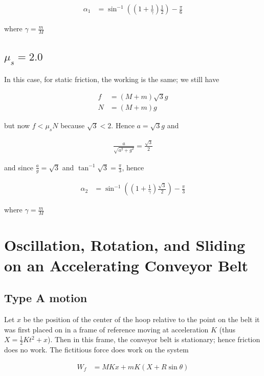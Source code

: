 \documentclass{article}
\newcommand{\half}{\frac{1}{2}}
\begin{document}
\begin{align*}
\alpha_1 &= \sin^{-1}((1 + \frac{1}{\gamma}) \half) - \frac{\pi}{6}
\end{align*}

where $\gamma = \frac{m}{M}$

\subsection{$\mu_s = 2.0$}

In this case, for static friction, the working is the same; we still have

\begin{align*}
f &= (M+m)\sqrt{3}g \\
N &= (M+m)g
\end{align*}

but now $f < \mu_s N$ because $\sqrt 3 < 2$. Hence $a = \sqrt{3}g$ and

\begin{align*}
\frac{a}{\sqrt{a^2 + g^2}} = \frac{\sqrt{3}}{2}
\end{align*}

and since $\frac{a}{g} = \sqrt{3}$ and $\tan^{-1} \sqrt 3 = \frac{\pi}{3}$, hence

\begin{align*}
\alpha_2 &= \sin^{-1}((1 + \frac{1}{\gamma}) \frac{\sqrt{3}}{2}) - \frac{\pi}{3}
\end{align*}

where $\gamma = \frac{m}{M}$

\section{Oscillation, Rotation, and Sliding on an Accelerating Conveyor Belt}

\subsection{Type A motion}

Let $x$ be the position of the center of the hoop relative to the point on the belt it was first placed on in a frame of reference moving at acceleration $K$ (thus $X = \half Kt^2 + x$). Then in this frame, the conveyor belt is stationary; hence friction does no work. The fictitious force does work on the system

\begin{align*}
W_f &= MKx + mK(X + R\sin\theta)
\end{align*}
\end{document}
